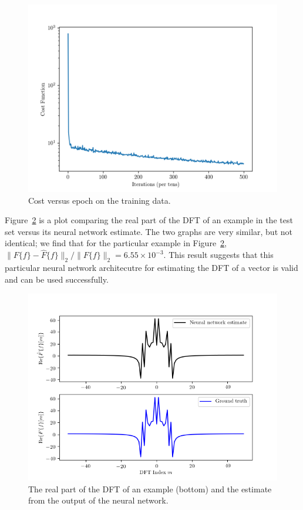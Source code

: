 \documentclass[12pt]{article}
\begin{document}
\begin{figure}
\centering
\includegraphics[scale=.5]{figures/final_cost_vs_epoch.png}
\caption{Cost versus epoch on the training data.}
\label{f-example_cost_vs_epoch}
\end{figure}

Figure~\ref{f-DFT_compare} is a plot comparing the real part of the DFT of an example in the test set 
versus its neural network estimate. The two graphs are very similar, but not identical; we 
find that for the particular example in Figure~\ref{f-DFT_compare}, 
$\|F\{f\} - \hat{F}\{f\}\|_2 / \|F\{f\}\|_2 = 6.55 \times 10^{-3}$. This result suggests that this particular
neural network architecutre for estimating the DFT of a vector is valid and can be used successfully.

\begin{figure}
\centering
\includegraphics[scale=.65]{figures/DFT_comparisons.png}
\caption{The real part of the DFT of an example (bottom) and the estimate from the output of the neural network.}
\label{f-DFT_compare}
\end{figure}
\end{document}

